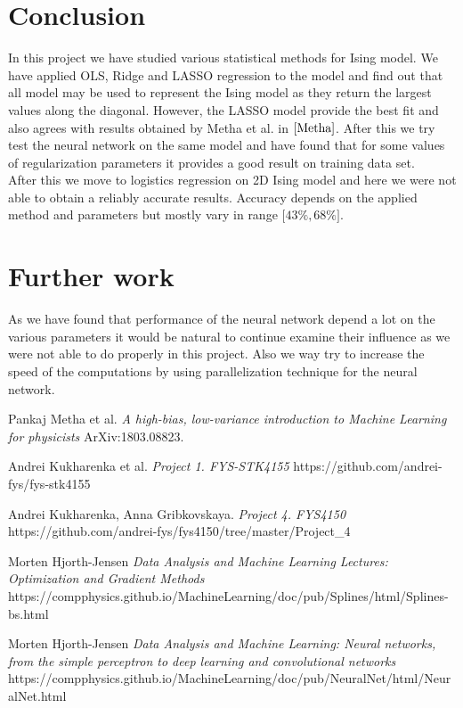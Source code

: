 \documentclass[10pt]{article}
\begin{document}
\section{Conclusion}
In this project we have studied various statistical methods for Ising model. We have applied OLS, Ridge and LASSO regression to the model and find out that all model may be used to represent the Ising model as they return the largest values along the diagonal. However, the LASSO model provide the best fit and also agrees with results obtained by Metha et al. in $\cite{Metha}$. 
After this we try test the neural network on the same model and have found that for some values of regularization parameters it provides a good result on training data set. \\
After this we move to logistics regression on 2D Ising model and here we were not able to obtain a reliably accurate results. Accuracy depends on the applied method and parameters but mostly vary in range $\lbrack 43\% , 68\% \rbrack$.\\

\section{Further work}
As we have found that performance of the neural network depend a lot on the various parameters it would be natural to continue examine their influence as we were not able to do properly in this project. Also we way try to increase the speed of the computations by using parallelization technique for the neural network.


\newpage
\begin{thebibliography}{9}
	Pankaj Metha et al. 
	\textit{A high-bias, low-variance introduction to Machine Learning for physicists}
	ArXiv:1803.08823.
	
	Andrei Kukharenka et al.
	\textit{Project 1. FYS-STK4155 }
	https://github.com/andrei-fys/fys-stk4155
	
	Andrei Kukharenka, Anna Gribkovskaya.
	\textit{Project 4. FYS4150 }
	https://github.com/andrei-fys/fys4150/tree/master/Project_4
	
	Morten Hjorth-Jensen 
	\textit{Data Analysis and Machine Learning Lectures: Optimization and Gradient Methods}
	https://compphysics.github.io/MachineLearning/doc/pub/Splines/html/Splines-bs.html
		
	Morten Hjorth-Jensen 
	\textit{Data Analysis and Machine Learning: Neural networks, from the simple perceptron to deep learning and convolutional networks}
	https://compphysics.github.io/MachineLearning/doc/pub/NeuralNet/html/NeuralNet.html
	
\end{thebibliography}
\end{document}
